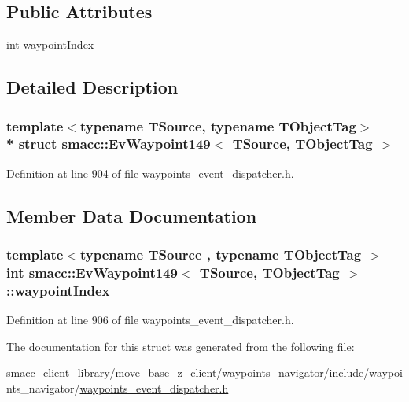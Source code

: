 \subsection*{Public Attributes}
\begin{DoxyCompactItemize}
\item 
int \hyperlink{structsmacc_1_1EvWaypoint149_a77f9d2031970cf2a7c294140faae92a5}{waypoint\+Index}
\end{DoxyCompactItemize}


\subsection{Detailed Description}
\subsubsection*{template$<$typename T\+Source, typename T\+Object\+Tag$>$\\*
struct smacc\+::\+Ev\+Waypoint149$<$ T\+Source, T\+Object\+Tag $>$}



Definition at line 904 of file waypoints\+\_\+event\+\_\+dispatcher.\+h.



\subsection{Member Data Documentation}
\subsubsection[{\texorpdfstring{waypoint\+Index}{waypointIndex}}]{\setlength{\rightskip}{0pt plus 5cm}template$<$typename T\+Source , typename T\+Object\+Tag $>$ int {\bf smacc\+::\+Ev\+Waypoint149}$<$ T\+Source, T\+Object\+Tag $>$\+::waypoint\+Index}\hypertarget{structsmacc_1_1EvWaypoint149_a77f9d2031970cf2a7c294140faae92a5}{}\label{structsmacc_1_1EvWaypoint149_a77f9d2031970cf2a7c294140faae92a5}


Definition at line 906 of file waypoints\+\_\+event\+\_\+dispatcher.\+h.



The documentation for this struct was generated from the following file\+:\begin{DoxyCompactItemize}
\item 
smacc\+\_\+client\+\_\+library/move\+\_\+base\+\_\+z\+\_\+client/waypoints\+\_\+navigator/include/waypoints\+\_\+navigator/\hyperlink{waypoints__event__dispatcher_8h}{waypoints\+\_\+event\+\_\+dispatcher.\+h}\end{DoxyCompactItemize}
